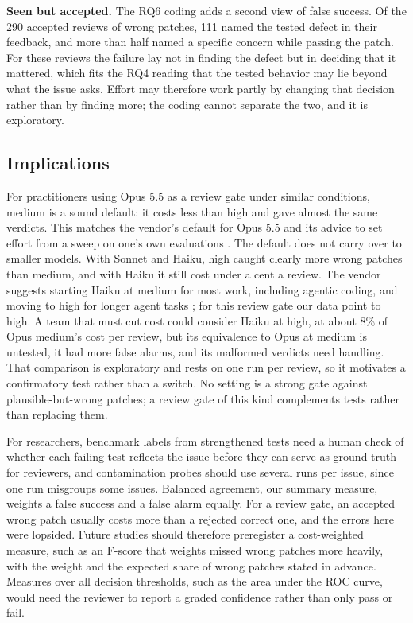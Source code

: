 \documentclass[sigconf,nonacm]{acmart}
\begin{document}
\textbf{Seen but accepted.} The RQ6 coding adds a second view of false success. Of the 290 accepted reviews of wrong patches, 111 named the tested defect in their feedback, and more than half named a specific concern while passing the patch. For these reviews the failure lay not in finding the defect but in deciding that it mattered, which fits the RQ4 reading that the tested behavior may lie beyond what the issue asks. Effort may therefore work partly by changing that decision rather than by finding more; the coding cannot separate the two, and it is exploratory.

\subsection{Implications}\label{sec:implications}

For practitioners using Opus 5.5 as a review gate under similar conditions, medium is a sound default: it costs less than high and gave almost the same verdicts. This matches the vendor's default for Opus 5.5 and its advice to set effort from a sweep on one's own evaluations \cite{anthropic2026effort}. The default does not carry over to smaller models. With Sonnet and Haiku, high caught clearly more wrong patches than medium, and with Haiku it still cost under a cent a review. The vendor suggests starting Haiku at medium for most work, including agentic coding, and moving to high for longer agent tasks \cite{anthropic2026effort}; for this review gate our data point to high. A team that must cut cost could consider Haiku at high, at about 8\% of Opus medium's cost per review, but its equivalence to Opus at medium is untested, it had more false alarms, and its malformed verdicts need handling. That comparison is exploratory and rests on one run per review, so it motivates a confirmatory test rather than a switch. No setting is a strong gate against plausible-but-wrong patches; a review gate of this kind complements tests rather than replacing them.

For researchers, benchmark labels from strengthened tests need a human check of whether each failing test reflects the issue before they can serve as ground truth for reviewers, and contamination probes should use several runs per issue, since one run misgroups some issues. Balanced agreement, our summary measure, weights a false success and a false alarm equally. For a review gate, an accepted wrong patch usually costs more than a rejected correct one, and the errors here were lopsided. Future studies should therefore preregister a cost-weighted measure, such as an F-score that weights missed wrong patches more heavily, with the weight and the expected share of wrong patches stated in advance. Measures over all decision thresholds, such as the area under the ROC curve, would need the reviewer to report a graded confidence rather than only pass or fail.
\end{document}
